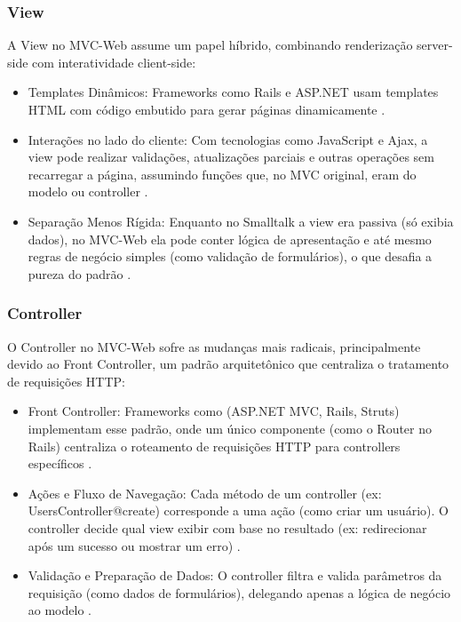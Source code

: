         \subsubsection{View}
    
            \par A View no MVC-Web assume um papel híbrido, combinando renderização server-side com interatividade client-side:

            \begin{itemize}
                \item Templates Dinâmicos: Frameworks como Rails e ASP.NET usam templates HTML com código embutido para gerar páginas dinamicamente \cite{inproceedings:grove:2011}.

                \item Interações no lado do cliente: Com tecnologias como JavaScript e Ajax, a view pode realizar validações, atualizações parciais e outras operações sem recarregar a página, assumindo funções que, no MVC original, eram do modelo ou controller \cite{inproceedings:grove:2011}.

                \item Separação Menos Rígida: Enquanto no Smalltalk a view era passiva (só exibia dados), no MVC-Web ela pode conter lógica de apresentação e até mesmo regras de negócio simples (como validação de formulários), o que desafia a pureza do padrão \cite{inproceedings:grove:2011}.
            \end{itemize}
        
       
        \subsubsection{Controller}
        
        \par O Controller no MVC-Web sofre as mudanças mais radicais, principalmente devido ao Front Controller, um padrão arquitetônico que centraliza o tratamento de requisições HTTP:

        \begin{itemize}
            \item Front Controller: Frameworks como (ASP.NET MVC, Rails, Struts) implementam esse padrão, onde um único componente (como o Router no Rails) centraliza o roteamento de requisições HTTP para controllers específicos \cite{inproceedings:grove:2011}.

            \item Ações e Fluxo de Navegação: Cada método de um controller (ex: UsersController@create) corresponde a uma ação (como criar um usuário). O controller decide qual view exibir com base no resultado (ex: redirecionar após um sucesso ou mostrar um erro) \cite{inproceedings:grove:2011}.

            \item Validação e Preparação de Dados: O controller filtra e valida parâmetros da requisição (como dados de formulários), delegando apenas a lógica de negócio ao modelo \cite{inproceedings:grove:2011}.            
        \end{itemize}